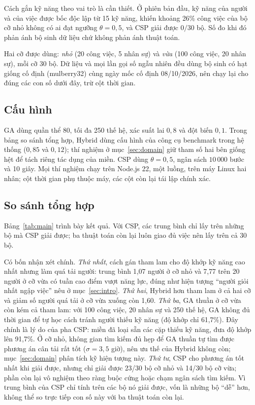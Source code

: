 \documentclass{IEEEtran}
\begin{document}
Cách gắn kỹ năng theo vai trò là cần thiết. Ở phiên bản đầu, kỹ năng của người và của việc được bốc độc lập từ 15 kỹ năng, khiến khoảng 26\% công việc của bộ cỡ nhỏ không có ai đạt ngưỡng $\theta=0{,}5$, và CSP giải được $0/30$ bộ. Số đo khi đó phản ánh bộ sinh dữ liệu chứ không phản ánh thuật toán.

Hai cỡ được dùng: \emph{nhỏ} (20 công việc, 5 nhân sự) và \emph{vừa} (100 công việc, 20 nhân sự), mỗi cỡ 30 bộ. Dữ liệu và mọi lần gọi số ngẫu nhiên đều dùng bộ sinh có hạt giống cố định (mulberry32) cùng ngày mốc cố định 08/10/2026, nên chạy lại cho đúng các con số dưới đây, trừ cột thời gian.

\subsection{Cấu hình}

GA dùng quần thể 80, tối đa 250 thế hệ, xác suất lai $0{,}8$ và đột biến $0{,}1$. Trong bảng so sánh tổng hợp, Hybrid dùng cấu hình của công cụ benchmark trong hệ thống ($0{,}85$ và $0{,}12$); thí nghiệm ở mục~\ref{sec:domain} giữ tham số hai bên giống hệt để tách riêng tác dụng của miền. CSP dùng $\theta=0{,}5$, ngân sách $10\,000$ bước và 10 giây. Mọi thí nghiệm chạy trên Node.js 22, một luồng, trên máy Linux hai nhân; cột thời gian phụ thuộc máy, các cột còn lại tái lập chính xác.

\subsection{So sánh tổng hợp}

Bảng~\ref{tab:main} trình bày kết quả. Với CSP, các trung bình chỉ lấy trên những bộ mà CSP giải được; ba thuật toán còn lại luôn giao đủ việc nên lấy trên cả 30 bộ.


Có bốn nhận xét chính. \emph{Thứ nhất}, cách gán tham lam cho độ khớp kỹ năng cao nhất nhưng làm quá tải người: trung bình 1,07 người ở cỡ nhỏ và 7,77 trên 20 người ở cỡ vừa có tuần cao điểm vượt năng lực, đúng như hiện tượng ``người giỏi nhất ngập việc'' nêu ở mục~\ref{sec:intro}. \emph{Thứ hai}, Hybrid hơn tham lam ở cả hai cỡ và giảm số người quá tải ở cỡ vừa xuống còn 1,60. \emph{Thứ ba}, GA thuần ở cỡ vừa còn kém cả tham lam: với 100 công việc, 20 nhân sự và 250 thế hệ, GA không đủ thời gian để tự học cách tránh người thiếu kỹ năng (độ khớp chỉ 61,7\%). Đây chính là lý do của pha CSP: miền đã loại sẵn các cặp thiếu kỹ năng, đưa độ khớp lên 91,7\%. Ở cỡ nhỏ, không gian tìm kiếm đủ hẹp để GA thuần tự tìm được phương án cân tải rất tốt ($\sigma=3{,}5$ giờ), nên ưu thế của Hybrid không còn; mục~\ref{sec:domain} phân tích kỹ hiện tượng này. \emph{Thứ tư}, CSP cho phương án tốt nhất khi giải được, nhưng chỉ giải được 23/30 bộ cỡ nhỏ và 14/30 bộ cỡ vừa; phần còn lại vô nghiệm theo ràng buộc cứng hoặc chạm ngân sách tìm kiếm. Vì trung bình của CSP chỉ tính trên các bộ nó giải được, vốn là những bộ ``dễ'' hơn, không thể so trực tiếp con số này với ba thuật toán còn lại.
\end{document}
